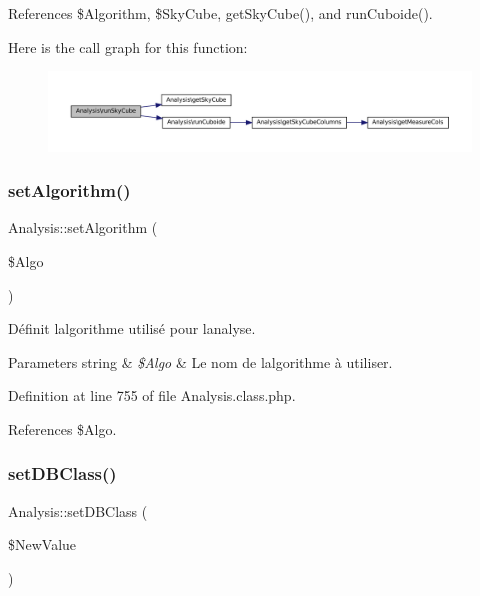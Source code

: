 References \$\+Algorithm, \$\+Sky\+Cube, get\+Sky\+Cube(), and run\+Cuboide().

Here is the call graph for this function\+:\nopagebreak
\begin{figure}[H]
\begin{center}
\leavevmode
\includegraphics[width=350pt]{class_analysis_a650bcf73f24eb914df10c9185ca40c67_cgraph}
\end{center}
\end{figure}
\mbox{\label{class_analysis_a0d88be05d67466f6fa98b5b0dcc38691}} 
\subsubsection{\texorpdfstring{set\+Algorithm()}{setAlgorithm()}}
{\footnotesize\ttfamily Analysis\+::set\+Algorithm (\begin{DoxyParamCaption}\item[{}]{\$\+Algo }\end{DoxyParamCaption})}

Définit l\textquotesingle{}algorithme utilisé pour l\textquotesingle{}analyse.


\begin{DoxyParams}[1]{Parameters}
string & {\em \$\+Algo} & Le nom de l\textquotesingle{}algorithme à utiliser. \\
\hline
\end{DoxyParams}


Definition at line 755 of file Analysis.\+class.\+php.



References \$\+Algo.

\mbox{\label{class_analysis_aabddf37a4240bafefd66b2bbff1b3058}} 
\subsubsection{\texorpdfstring{set\+D\+B\+Class()}{setDBClass()}\hspace{0.1cm}{\footnotesize\ttfamily [1/2]}}
{\footnotesize\ttfamily Analysis\+::set\+D\+B\+Class (\begin{DoxyParamCaption}\item[{}]{\$\+New\+Value }\end{DoxyParamCaption})}



